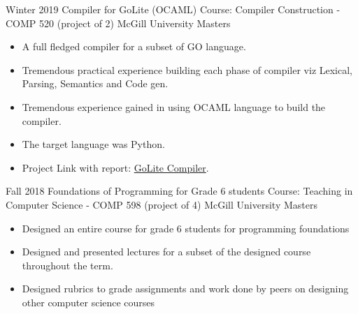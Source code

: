\documentclass[11pt,a4paper,sans]{moderncv} %
\begin{document}
        \cventry
            {Winter 2019} %
            {Compiler for GoLite (OCAML)} %
            {Course: Compiler Construction - COMP 520 (project of 2)} %
            {McGill University} %
            {Masters} 
            {
                \begin{itemize} %
                    \item A full fledged compiler for a subset of GO language.
                    \item Tremendous practical experience building each phase of compiler viz Lexical, Parsing, Semantics and Code gen. 
                    \item Tremendous experience gained in using OCAML language to build the compiler.
                    \item The target language was Python.
                    \item Project Link with report: \href{https://github.com/comp520/2019_group15.git}{GoLite Compiler}.
                \end{itemize}
            }
            {}

        \cventry
            {Fall 2018} %
            {Foundations of Programming for Grade 6 students} %
            {Course: Teaching in Computer Science - COMP 598 (project of 4)} %
            {McGill University} %
            {Masters} 
            {
                \begin{itemize} %
                    \item Designed an entire course for grade 6 students for programming foundations
                    \item Designed and presented lectures for a subset of the designed course throughout the term. 
                    \item Designed rubrics to grade assignments and work done by peers on designing other computer science courses
                \end{itemize}
            }
            {}
\end{document}
